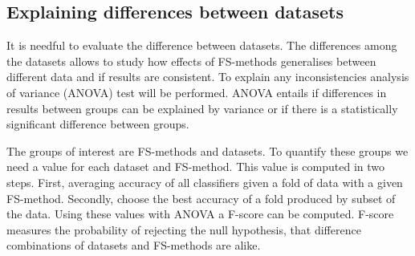 \subsection{Explaining differences between datasets}

It is needful to evaluate the difference between datasets. The differences among the datasets allows to study how effects of FS-methods generalises between different data and if results are consistent. To explain any inconsistencies analysis of variance (ANOVA) test will be performed. ANOVA entails if differences in results between groups can be explained by variance or if there is a statistically significant difference between groups.

The groups of interest are FS-methods and datasets. To quantify these groups we need a value for each dataset and FS-method. This value is computed in two steps. First, averaging accuracy of all classifiers given a fold of data with a given FS-method. Secondly, choose the best accuracy of a fold produced by subset of the data. Using these values with ANOVA a F-score can be computed. F-score measures the probability of rejecting the null hypothesis, that difference combinations of datasets and FS-methods are alike.

